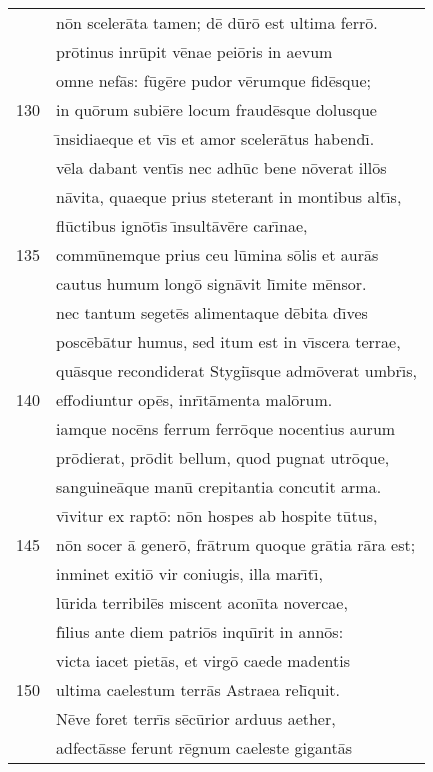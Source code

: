 \documentclass[paper=6in:9in,pagesize=pdftex,
               headinclude=on,footinclude=on,12pt]{scrbook}
\begin{document}
\begin{longtable}[p]{ r l }
 & n\=on sceler\=ata tamen; d\=e d\=ur\=o est ultima ferr\=o.\\ 
 & pr\=otinus inr\=upit v\=enae pei\=oris in aevum\\ 
 & omne nef\=as: f\=ug\=ere pudor v\=erumque fid\=esque;\\ 
130 & in qu\=orum subi\=ere locum fraud\=esque dolusque\\ 
 & \={\i}nsidiaeque et v\={\i}s et amor sceler\=atus habend\={\i}.\\ 
 & v\=ela dabant vent\={\i}s nec adh\=uc bene n\=overat ill\=os\\ 
 & n\=avita, quaeque prius steterant in montibus alt\={\i}s,\\ 
 & fl\=uctibus ign\=ot\={\i}s \={\i}nsult\=av\=ere car\={\i}nae,\\ 
135 & comm\=unemque prius ceu l\=umina s\=olis et aur\=as\\ 
 & cautus humum long\=o sign\=avit l\={\i}mite m\=ensor.\\ 
 & nec tantum seget\=es alimentaque d\=ebita d\={\i}ves\\ 
 & posc\=eb\=atur humus, sed itum est in v\={\i}scera terrae,\\ 
 & qu\=asque recondiderat Stygi\={\i}sque adm\=overat umbr\={\i}s,\\ 
140 & effodiuntur op\=es, inr\={\i}t\=amenta mal\=orum.\\ 
 & iamque noc\=ens ferrum ferr\=oque nocentius aurum\\ 
 & pr\=odierat, pr\=odit bellum, quod pugnat utr\=oque,\\ 
 & sanguine\=aque man\=u crepitantia concutit arma.\\ 
 & v\={\i}vitur ex rapt\=o: n\=on hospes ab hospite t\=utus,\\ 
145 & n\=on socer \=a gener\=o, fr\=atrum quoque gr\=atia r\=ara est;\\ 
 & inminet exiti\=o vir coniugis, illa mar\={\i}t\={\i},\\ 
 & l\=urida terribil\=es miscent acon\={\i}ta novercae,\\ 
 & f\={\i}lius ante diem patri\=os inqu\={\i}rit in ann\=os:\\ 
 & victa iacet piet\=as, et virg\=o caede madentis\\ 
150 & ultima caelestum terr\=as Astraea rel\={\i}quit.\\ 
 & \indent N\=eve foret terr\={\i}s s\=ec\=urior arduus aether,\\ 
 & adfect\=asse ferunt r\=egnum caeleste gigant\=as\\ 

\end{longtable}
\end{document}
